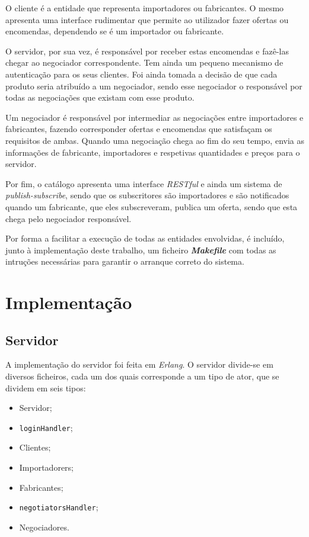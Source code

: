 \documentclass[a4paper]{report}
\begin{document}
	O cliente é a entidade que representa importadores ou fabricantes. 
	O mesmo apresenta uma interface rudimentar que permite ao utilizador fazer ofertas ou encomendas, dependendo se é um importador ou fabricante.
	
	O servidor, por sua vez, é responsável por receber estas encomendas e fazê-las chegar ao negociador correspondente. Tem ainda um pequeno mecanismo de autenticação para os seus clientes.
	Foi ainda tomada a decisão de que cada produto seria atribuído a um negociador, sendo esse negociador o responsável por todas as negociações que existam com esse produto.
	
	Um negociador é responsável por intermediar as negociações entre importadores e fabricantes, fazendo corresponder ofertas e encomendas que satisfaçam os requisitos de ambas.
	Quando uma negociação chega ao fim do seu tempo, envia as informações de fabricante, importadores e respetivas quantidades e preços para o servidor.

	Por fim, o catálogo apresenta uma interface \textit{RESTful} e ainda um sistema de \textit{publish-subscribe}, sendo que os subscritores são importadores e são notificados quando um fabricante, que eles subscreveram, publica um oferta, sendo que esta chega pelo negociador responsável.

	Por forma a facilitar a execução de todas as entidades envolvidas, é incluído, junto à implementação deste trabalho, um ficheiro \textbf{\textit{Makefile}} com todas as intruções necessárias para garantir o arranque correto do sistema.

	\section{Implementação}
	
	\subsection{Servidor}
	A implementação do servidor foi feita em \textit{Erlang}. O servidor divide-se em diversos ficheiros, cada um dos quais corresponde a um tipo de ator, que se dividem em seis tipos:
	\begin{itemize}
		\item Servidor;
		\item \texttt{loginHandler};
		\item Clientes;
		\item Importadorers;
		\item Fabricantes;
		\item \texttt{negotiatorsHandler};
		\item Negociadores.
	\end{itemize}
\end{document}

